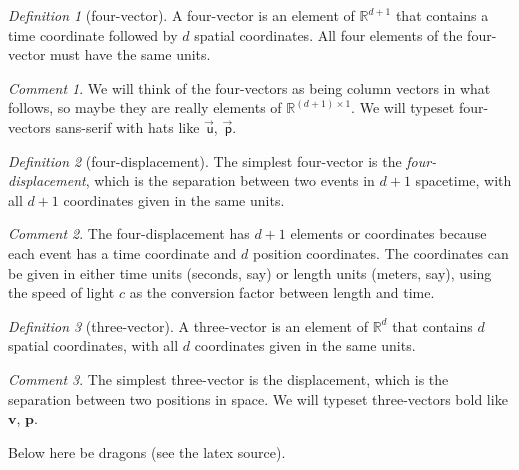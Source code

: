 \documentclass[10pt]{article}
\newcounter{par}
\theoremstyle{remark}
\newtheorem{definition}{Definition}
\theoremstyle{remark}
\newtheorem*{remark}{Comment}
\newcommand\upvec[1]{\!\vec{\,\mathrm{#1}}}
\newcommand{\tv}[1]{{\mathbf{#1}}} %
\newcommand{\fv}[1]{\upvec{\mathsf{#1}}} %
\begin{document}
\begin{definition}[four-vector]
    A four-vector is an element of $\mathbb{R}^{d+1}$ that contains a time coordinate followed by $d$ spatial coordinates.
    All four elements of the four-vector must have the same units.
\end{definition}
\begin{remark}
    We will think of the four-vectors as being column vectors in what follows, so maybe they are really elements of $\mathbb{R}^{(d+1)\times 1}$.
    We will typeset four-vectors sans-serif with hats like $\fv{u}$, $\fv{p}$.
\end{remark}

\begin{definition}[four-displacement]
    The simplest four-vector is the \emph{four-displacement}, which is the separation between two events in $d+1$ spacetime, with all $d+1$ coordinates given in the same units.
\end{definition}
\begin{remark}
    The four-displacement has $d+1$ elements or coordinates because each event has a time coordinate and $d$ position coordinates.
    The coordinates can be given in either time units (seconds, say) or length units (meters, say), using the speed of light $c$ as the conversion factor between length and time.
\end{remark}

\begin{definition}[three-vector]
    A three-vector is an element of $\mathbb{R}^{d}$ that contains $d$ spatial coordinates, with all $d$ coordinates given in the same units.
\end{definition}
\begin{remark}
    The simplest three-vector is the displacement, which is the separation between two positions in space.
    We will typeset three-vectors bold like $\tv{v}$, $\tv{p}$.
\end{remark}

Below here be dragons (see the latex source).
\end{document}
